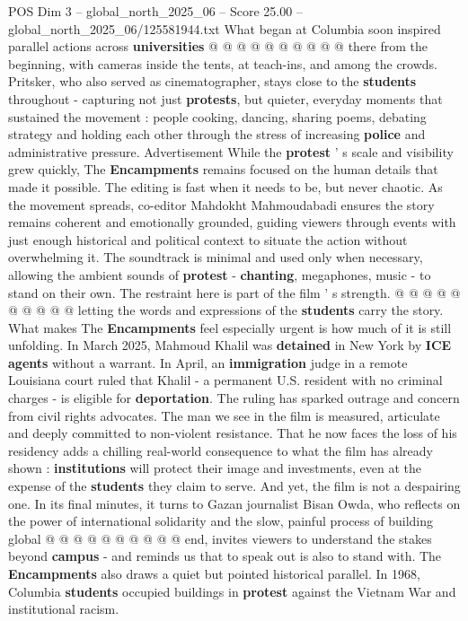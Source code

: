 \begin{textsample}{POS Dim 3 – global\_north\_2025\_06 – Score 25.00 – global\_north\_2025\_06/125581944.txt}
What began at Columbia soon inspired parallel actions across \textbf{universities} @ @ @ @ @ @ @ @ @ @ there from the beginning, with cameras inside the tents, at teach-ins, and among the crowds.
Pritsker, who also served as cinematographer, stays close to the \textbf{students} throughout - capturing not just \textbf{protests}, but quieter, everyday moments that sustained the movement : people cooking, dancing, sharing poems, debating strategy and holding each other through the stress of increasing \textbf{police} and administrative pressure.
Advertisement While the \textbf{protest} ' s scale and visibility grew quickly, The \textbf{Encampments} remains focused on the human details that made it possible.
The editing is fast when it needs to be, but never chaotic.
As the movement spreads, co-editor Mahdokht Mahmoudabadi ensures the story remains coherent and emotionally grounded, guiding viewers through events with just enough historical and political context to situate the action without overwhelming it.
The soundtrack is minimal and used only when necessary, allowing the ambient sounds of \textbf{protest} - \textbf{chanting}, megaphones, music - to stand on their own.
The restraint here is part of the film ' s strength. @ @ @ @ @ @ @ @ @ @ letting the words and expressions of the \textbf{students} carry the story.
What makes The \textbf{Encampments} feel especially urgent is how much of it is still unfolding.
In March 2025, Mahmoud Khalil was \textbf{detained} in New York by \textbf{ICE} \textbf{agents} without a warrant.
In April, an \textbf{immigration} judge in a remote Louisiana court ruled that Khalil - a permanent U.S. resident with no criminal charges - is eligible for \textbf{deportation}.
The ruling has sparked outrage and concern from civil rights advocates.
The man we see in the film is measured, articulate and deeply committed to non-violent resistance.
That he now faces the loss of his residency adds a chilling real-world consequence to what the film has already shown : \textbf{institutions} will protect their image and investments, even at the expense of the \textbf{students} they claim to serve.
And yet, the film is not a despairing one.
In its final minutes, it turns to Gazan journalist Bisan Owda, who reflects on the power of international solidarity and the slow, painful process of building global @ @ @ @ @ @ @ @ @ @ end, invites viewers to understand the stakes beyond \textbf{campus} - and reminds us that to speak out is also to stand with.
The \textbf{Encampments} also draws a quiet but pointed historical parallel.
In 1968, Columbia \textbf{students} occupied buildings in \textbf{protest} against the Vietnam War and institutional racism.

\end{textsample}
